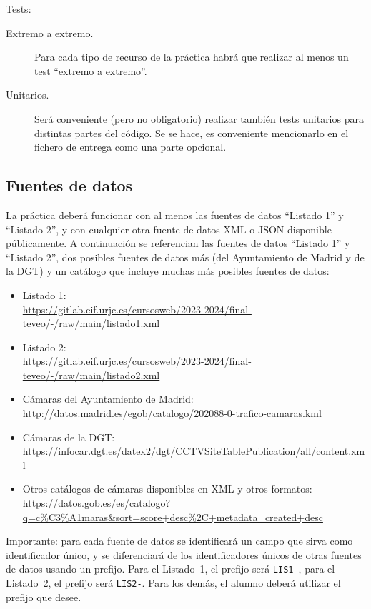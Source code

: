 Tests:

\begin{description}
\item[Extremo a extremo.] Para cada tipo de recurso de la práctica habrá que realizar al menos un test ``extremo a extremo''.
\item[Unitarios.] Será conveniente (pero no obligatorio) realizar también tests unitarios para distintas partes del código. Se se hace, es conveniente mencionarlo en el fichero de entrega como una parte opcional.
\end{description}

\subsection{Fuentes de datos}
\label{sec:practica-2024-05:datos}

La práctica deberá funcionar con al menos las fuentes de datos ``Listado 1'' y ``Listado 2'', y con cualquier otra fuente de datos XML o JSON disponible públicamente. A continuación se referencian las fuentes de datos ``Listado 1'' y ``Listado 2'', dos posibles fuentes de datos más (del Ayuntamiento de Madrid y de la DGT) y un catálogo que incluye muchas más posibles fuentes de datos:

\begin{itemize}
\item Listado 1: \\
  \url{https://gitlab.eif.urjc.es/cursosweb/2023-2024/final-teveo/-/raw/main/listado1.xml}
\item Listado 2: \\
  \url{https://gitlab.eif.urjc.es/cursosweb/2023-2024/final-teveo/-/raw/main/listado2.xml}
\item Cámaras del Ayuntamiento de Madrid: \\
  \url{http://datos.madrid.es/egob/catalogo/202088-0-trafico-camaras.kml}
\item Cámaras de la DGT: \\
  \url{https://infocar.dgt.es/datex2/dgt/CCTVSiteTablePublication/all/content.xml}
\item Otros catálogos de cámaras disponibles en XML y otros formatos: \\
  \url{https://datos.gob.es/es/catalogo?q=c%C3%A1maras&sort=score+desc%2C+metadata_created+desc}
\end{itemize}

Importante: para cada fuente de datos se identificará un campo que sirva como identificador único, y se diferenciará de los identificadores únicos de otras fuentes de datos usando un prefijo. Para el Listado~1, el prefijo será \verb|LIS1-|, para el Listado~2, el prefijo será \verb|LIS2-|. Para los demás, el alumno deberá utilizar el prefijo que desee.

